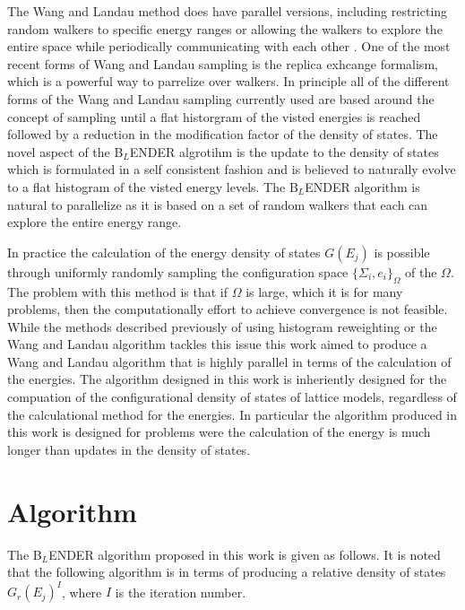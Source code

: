 \documentclass[aps,prl,reprint,superscriptaddress,showkeys]{revtex4-1}
\begin{document}
    The Wang and Landau method does have parallel versions, including  restricting random walkers to specific energy ranges or allowing the walkers to explore the entire space while periodically communicating with each other \cite{MP_Wang_Landau,P_imp_Wang_Landau, Hframe_Wang_Landau}. One of the most recent forms of Wang and Landau sampling is the replica exhcange formalism, which is a powerful way to parrelize over walkers. In principle all of the different forms of the Wang and Landau sampling currently used are based around the concept of sampling until a flat historgram of the visted energies is reached followed by a reduction in the modification factor of the density of states. The novel aspect of the B$_{L}$ENDER algrotihm is the update to the density of states which is formulated in a self consistent fashion and is believed to naturally evolve to a flat histogram of the visted energy levels.  The B$_{L}$ENDER algorithm is  natural to parallelize as it is based on a set of random walkers that each can explore the entire energy range. 

   In practice the calculation of the energy density of states $G(E_j)$  is  possible through uniformly randomly sampling the configuration space $\{ \Sigma_i, e_i \}_\Omega $ of the $\Omega$.  The problem with this method is that if $\Omega$ is large, which it is for many problems,  then the computationally effort to achieve convergence is not feasible. While the methods described previously of using histogram reweighting or the Wang and Landau algorithm tackles this issue this work aimed to produce a Wang and Landau  algorithm that is highly parallel in terms of the calculation of the energies. The algorithm designed in this work is inheriently designed for the compuation of the configurational density of states of lattice models, regardless of the calculational method for the energies. In particular the algorithm produced in this work is designed for problems were the calculation of the energy is much longer than updates in the density of states. 

\section{Algorithm}
   
The B$_{L}$ENDER algorithm proposed in this work  is given as follows. It is noted that the following algorithm is in terms of producing a relative density of states $G_{r}(E_j)^I$, where $I$ is the iteration number. 
\end{document}
